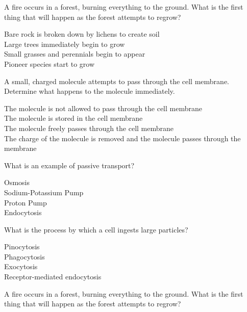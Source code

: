 \documentclass{exam}
\begin{document}
\begin{questions}
\question A fire occurs in a forest, burning everything to the ground. What is the first thing that will happen as the forest attempts to regrow?

\begin{oneparchoices}
	\choice Bare rock is broken down by lichens to create soil
	\\
	\choice Large trees immediately begin to grow
	\\
	\choice Small grasses and perennials begin to appear
	\\
	\choice Pioneer species start to grow
\end{oneparchoices}

\question A small, charged molecule attempts to pass through the cell membrane. Determine what happens to the molecule immediately.

\begin{oneparchoices}
	\choice The molecule is not allowed to pass through the cell membrane
	\\
	\choice The molecule is stored in the cell membrane 
	\\
	\choice The molecule freely passes through the cell membrane
	\\
	\choice The charge of the molecule is removed and the molecule passes through the membrane 
\end{oneparchoices}

\question What is an example of passive transport?

\begin{oneparchoices}
	\choice Osmosis
	\\
	\choice Sodium-Potassium Pump
	\\
	\choice Proton Pump
	\\
	\choice Endocytosis
\end{oneparchoices}

\question What is the process by which a cell ingests large particles?

\begin{oneparchoices}
	\choice Pinocytosis
	\\
	\choice Phagocytosis
	\\
	\choice Exocytosis
	\\
	\choice Receptor-mediated endocytosis
\end{oneparchoices}

\question A fire occurs in a forest, burning everything to the ground. What is the first thing that will happen as the forest attempts to regrow?


\end{questions}
\end{document}
